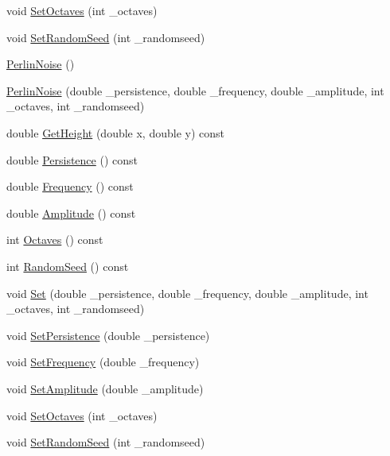 \begin{DoxyCompactItemize}
\item 
void \hyperlink{class_perlin_noise_ad4a4d35a9758079460dd2091dca03266}{Set\+Octaves} (int \+\_\+octaves)
\item 
void \hyperlink{class_perlin_noise_ae1d46c5446cb8f8226c83513c895245c}{Set\+Random\+Seed} (int \+\_\+randomseed)
\item 
\hyperlink{class_perlin_noise_a1219657e8f3731aed347ba67d7b3cdcd}{Perlin\+Noise} ()
\item 
\hyperlink{class_perlin_noise_a3926062e9211b00fedd72b1b5d02a537}{Perlin\+Noise} (double \+\_\+persistence, double \+\_\+frequency, double \+\_\+amplitude, int \+\_\+octaves, int \+\_\+randomseed)
\item 
double \hyperlink{class_perlin_noise_a42bab5abb182be779578df722b32ee68}{Get\+Height} (double x, double y) const 
\item 
double \hyperlink{class_perlin_noise_ad0a82f6c8cd0b0b7a4d6d90bd1279fe8}{Persistence} () const 
\item 
double \hyperlink{class_perlin_noise_add09140662f5fadc3f1e0eec512a18d0}{Frequency} () const 
\item 
double \hyperlink{class_perlin_noise_a8f642423552f6a561e31f1a7053eb6bb}{Amplitude} () const 
\item 
int \hyperlink{class_perlin_noise_a099788d1c748e7704f21ffcfd004698d}{Octaves} () const 
\item 
int \hyperlink{class_perlin_noise_a43b043813ffb2e9546660bc21fa054cd}{Random\+Seed} () const 
\item 
void \hyperlink{class_perlin_noise_a8abb59af3f09c7109b43b208eb4a33c4}{Set} (double \+\_\+persistence, double \+\_\+frequency, double \+\_\+amplitude, int \+\_\+octaves, int \+\_\+randomseed)
\item 
void \hyperlink{class_perlin_noise_a6fc4a8c6d9be6b7139dfc5d9771321f5}{Set\+Persistence} (double \+\_\+persistence)
\item 
void \hyperlink{class_perlin_noise_adac1a028e0c19d621577ca4f2102820b}{Set\+Frequency} (double \+\_\+frequency)
\item 
void \hyperlink{class_perlin_noise_adfe9927f5f81906d06224289b428baf5}{Set\+Amplitude} (double \+\_\+amplitude)
\item 
void \hyperlink{class_perlin_noise_ad4a4d35a9758079460dd2091dca03266}{Set\+Octaves} (int \+\_\+octaves)
\item 
void \hyperlink{class_perlin_noise_ae1d46c5446cb8f8226c83513c895245c}{Set\+Random\+Seed} (int \+\_\+randomseed)
\end{DoxyCompactItemize}


